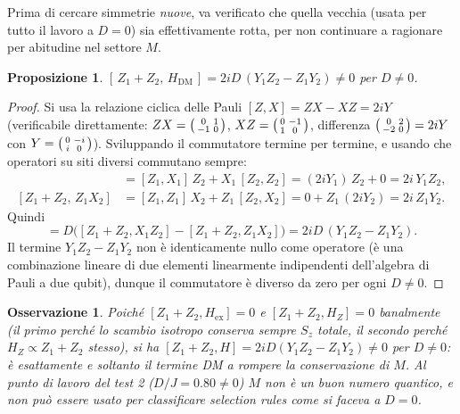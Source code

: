 \documentclass[11pt,a4paper]{article}
\newtheorem{proposizione}{Proposizione}
\newtheorem{osservazione}{Osservazione}
\begin{document}
Prima di cercare simmetrie \emph{nuove}, va verificato che quella vecchia (usata per tutto il
lavoro a $D=0$) sia effettivamente rotta, per non continuare a ragionare per abitudine nel
settore $M$.

\begin{proposizione}
\label{prop:Sz-rotto}
$[\,Z_1+Z_2,\,H_{\mathrm{DM}}\,] = 2iD\,(Y_1Z_2-Z_1Y_2) \neq 0$ per $D\neq0$.
\end{proposizione}

\begin{proof}
Si usa la relazione ciclica delle Pauli $[Z,X]=ZX-XZ=2iY$ (verificabile direttamente:
$ZX=\begin{psmallmatrix}0&1\\-1&0\end{psmallmatrix}$,
$XZ=\begin{psmallmatrix}0&-1\\1&0\end{psmallmatrix}$, differenza $\begin{psmallmatrix}0&2\\-2&0\end{psmallmatrix}=2iY$
con $Y=\begin{psmallmatrix}0&-i\\i&0\end{psmallmatrix}$). Sviluppando il commutatore termine per
termine, e usando che operatori su siti diversi commutano sempre:
\begin{align}
[Z_1+Z_2,\,X_1Z_2] &= [Z_1,X_1]\,Z_2 + X_1\,[Z_2,Z_2]
= (2iY_1)\,Z_2 + 0 = 2i\,Y_1Z_2, \\
[Z_1+Z_2,\,Z_1X_2] &= [Z_1,Z_1]\,X_2 + Z_1\,[Z_2,X_2]
= 0 + Z_1\,(2iY_2) = 2i\,Z_1Y_2.
\end{align}
Quindi
\begin{equation}
[Z_1+Z_2,\,H_{\mathrm{DM}}] = D\Big([Z_1+Z_2,X_1Z_2]-[Z_1+Z_2,Z_1X_2]\Big)
= 2iD\,(Y_1Z_2-Z_1Y_2).
\end{equation}
Il termine $Y_1Z_2-Z_1Y_2$ non è identicamente nullo come operatore (è una combinazione lineare
di due elementi linearmente indipendenti dell'algebra di Pauli a due qubit), dunque il
commutatore è diverso da zero per ogni $D\neq0$.
\end{proof}

\begin{osservazione}
Poiché $[Z_1+Z_2,H_{\mathrm{ex}}]=0$ e $[Z_1+Z_2,H_Z]=0$ banalmente (il primo perché lo scambio
isotropo conserva sempre $S_z$ totale, il secondo perché $H_Z\propto Z_1+Z_2$ stesso), si ha
$[Z_1+Z_2,H]=2iD(Y_1Z_2-Z_1Y_2)\neq0$ per $D\neq0$: è esattamente e soltanto il termine DM a
rompere la conservazione di $M$. Al punto di lavoro del test 2 ($D/J=0.80\neq0$) $M$ \emph{non}
è un buon numero quantico, e non può essere usato per classificare selection rules come si
faceva a $D=0$.
\end{osservazione}
\end{document}

